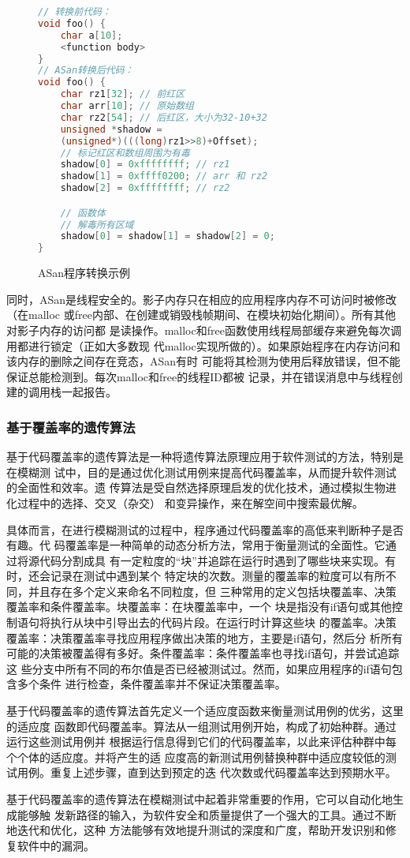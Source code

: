 \begin{figure}[H]
\begin{lstlisting}[language=C++]
// 转换前代码：
void foo() {
	char a[10];
	<function body>
}
// ASan转换后代码：
void foo() {
	char rz1[32]; // 前红区
	char arr[10]; // 原始数组
	char rz2[54]; // 后红区，大小为32-10+32
	unsigned *shadow =
	(unsigned*)(((long)rz1>>8)+Offset);
	// 标记红区和数组周围为有毒
	shadow[0] = 0xffffffff; // rz1
	shadow[1] = 0xffff0200; // arr 和 rz2
	shadow[2] = 0xffffffff; // rz2

	// 函数体
	// 解毒所有区域
	shadow[0] = shadow[1] = shadow[2] = 0;
}
\end{lstlisting}
\caption{ASan程序转换示例}
\label{lst:asan}
\end{figure}

同时，ASan是线程安全的。影子内存只在相应的应用程序内存不可访问时被修改（在malloc
或free内部、在创建或销毁栈帧期间、在模块初始化期间）。所有其他对影子内存的访问都
是读操作。malloc和free函数使用线程局部缓存来避免每次调用都进行锁定（正如大多数现
代malloc实现所做的）。如果原始程序在内存访问和该内存的删除之间存在竞态，ASan有时
可能将其检测为使用后释放错误，但不能保证总能检测到。每次malloc和free的线程ID都被
记录，并在错误消息中与线程创建的调用栈一起报告。

\subsubsection{基于覆盖率的遗传算法}

基于代码覆盖率的遗传算法是一种将遗传算法原理应用于软件测试的方法，特别是在模糊测
试中，目的是通过优化测试用例来提高代码覆盖率，从而提升软件测试的全面性和效率。遗
传算法是受自然选择原理启发的优化技术，通过模拟生物进化过程中的选择、交叉（杂交）
和变异操作，来在解空间中搜索最优解。

具体而言，在进行模糊测试的过程中，程序通过代码覆盖率的高低来判断种子是否有趣。代
码覆盖率是一种简单的动态分析方法，常用于衡量测试的全面性。它通过将源代码分割成具
有一定粒度的“块”并追踪在运行时遇到了哪些块来实现。有时，还会记录在测试中遇到某个
特定块的次数。测量的覆盖率的粒度可以有所不同，并且存在多个定义来命名不同粒度，但
三种常用的定义包括块覆盖率、决策覆盖率和条件覆盖率。块覆盖率：在块覆盖率中，一个
块是指没有if语句或其他控制语句将执行从块中引导出去的代码片段。在运行时计算这些块
的覆盖率。决策覆盖率：决策覆盖率寻找应用程序做出决策的地方，主要是if语句，然后分
析所有可能的决策被覆盖得有多好。条件覆盖率：条件覆盖率也寻找if语句，并尝试追踪这
些分支中所有不同的布尔值是否已经被测试过。然而，如果应用程序的if语句包含多个条件
进行检查，条件覆盖率并不保证决策覆盖率。

基于代码覆盖率的遗传算法首先定义一个适应度函数来衡量测试用例的优劣，这里的适应度
函数即代码覆盖率。算法从一组测试用例开始，构成了初始种群。通过运行这些测试用例并
根据运行信息得到它们的代码覆盖率，以此来评估种群中每个个体的适应度。并将产生的适
应度高的新测试用例替换种群中适应度较低的测试用例。重复上述步骤，直到达到预定的迭
代次数或代码覆盖率达到预期水平。

基于代码覆盖率的遗传算法在模糊测试中起着非常重要的作用，它可以自动化地生成能够触
发新路径的输入，为软件安全和质量提供了一个强大的工具。通过不断地迭代和优化，这种
方法能够有效地提升测试的深度和广度，帮助开发识别和修复软件中的漏洞。


